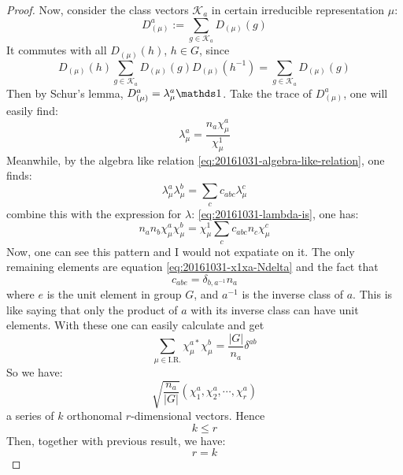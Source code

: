 \begin{proof}
        Now, consider the class vectors $\mathcal{K}_a$ in certain
        irreducible representation $\mu$:
        \begin{equation}
            D^a_{(\mu)} := \sum_{g\in \mathcal{K}_a} D_{(\mu)}(g)
        \end{equation}
        It commutes with all $D_{(\mu)}(h)$, $h\in G$, since
        $$D_{(\mu)}(h) \sum_{g\in \mathcal{K}_a} D_{(\mu)}(g)
        D_{(\mu)}(h^{-1})= \sum_{g\in \mathcal{K}_a} D_{(\mu)}(g)$$
        Then by Schur's lemma, $D^a_{(\mu)}= \lambda^a_\mu
        \id$.
        Take the trace of $D^a_{(\mu)}$, one will easily find:
        \begin{equation}
            \label{eq:20161031-lambda-is}
            \lambda^a_\mu = \frac{n_a\chi^a_{\mu}}{\chi^1_\mu}
        \end{equation}
        Meanwhile, by the algebra like relation
        \ref{eq:20161031-algebra-like-relation}, one finds:
        \begin{equation}
            \lambda^a_\mu \lambda^b_\mu = \sum_c c_{abc} \lambda^c_\mu
        \end{equation}
        combine this with the expression for $\lambda$:
        \ref{eq:20161031-lambda-is}, one has:
        \begin{equation}
            n_a n_b \chi^a_\mu \chi^b_\mu = \chi^1_\mu\sum_c
            c_{abc}n_c\chi^c_\mu
        \end{equation}
        Now, one can see this pattern and I would not expatiate on
        it. The only remaining elements are equation
        \ref{eq:20161031-x1xa-Ndelta} and the fact that
        \begin{equation}
            c_{abe} = \delta_{b,a^{-1}} n_a
        \end{equation}
        where $e$ is the unit element in group $G$, and $a^{-1}$ is
        the inverse class of $a$. This is like saying that only the
        product of $a$ with its inverse class can have unit elements.
        With these one can easily calculate and get
        \begin{equation}
            \sum_{\mu \in \text{I.R.}} \chi^{a*}_\mu\chi^b_\mu = 
            \frac{|G|}{n_a} \delta^{ab}
        \end{equation}
        So we have:
        \begin{equation}
            \sqrt{\frac{n_a}{|G|}}(\chi^a_1,\chi^a_2,\cdots,\chi^a_r)
        \end{equation}
        a series of $k$ orthonomal $r$-dimensional vectors. Hence
        \begin{equation}
            k\leq r
        \end{equation}
        Then, together with previous result, we have:
        \begin{equation}
            r = k
        \end{equation}
    \end{proof}
